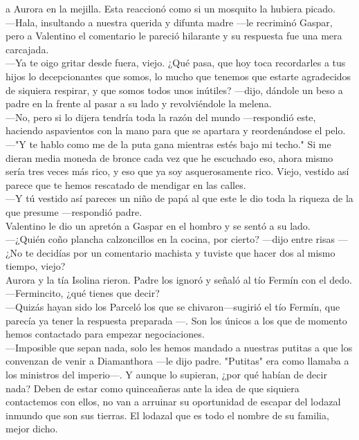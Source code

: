 \documentclass[
  letterpaper,
]{krantz}
\begin{document}
a Aurora en la mejilla. Esta reaccionó como si un mosquito la hubiera
picado.\\
---Hala, insultando a nuestra querida y difunta madre ---le recriminó
Gaspar, pero a Valentino el comentario le pareció hilarante y su
respuesta fue una mera carcajada.\\
---Ya te oigo gritar desde fuera, viejo. ¿Qué pasa, que hoy toca
recordarles a tus hijos lo decepcionantes que somos, lo mucho que
tenemos que estarte agradecidos de siquiera respirar, y que somos todos
unos inútiles? ---dijo, dándole un beso a padre en la frente al pasar a
su lado y revolviéndole la melena.\\
---No, pero si lo dijera tendría toda la razón del mundo ---respondió
este, haciendo aspavientos con la mano para que se apartara y
reordenándose el pelo. ~\\
---"Y te hablo como me de la puta gana mientras estés bajo mi techo." Si
me dieran media moneda de bronce cada vez que he escuchado eso, ahora
mismo sería tres veces más rico, y eso que ya soy asquerosamente rico.
Viejo, vestido así parece que te hemos rescatado de mendigar en las
calles.\\
---Y tú vestido así pareces un niño de papá al que este le dio toda la
riqueza de la que presume ---respondió padre.\\
Valentino le dio un apretón a Gaspar en el hombro y se sentó a su
lado.\\
---¿Quién coño plancha calzoncillos en la cocina, por cierto? ---dijo
entre risas --- ¿No te decidías por un comentario machista y tuviste que
hacer dos al mismo tiempo, viejo?\\
Aurora y la tía Isolina rieron. Padre los ignoró y señaló al tío Fermín
con el dedo.\\
---Fermincito, ¿qué tienes que decir?\\
---Quizás hayan sido los Parceló los que se chivaron---sugirió el tío
Fermín, que parecía ya tener la respuesta preparada ---. Son los únicos
a los que de momento hemos contactado para empezar negociaciones.\\
---Imposible que sepan nada, solo les hemos mandado a nuestras putitas a
que los convenzan de venir a Diamanthora ---le dijo padre. "Putitas" era
como llamaba a los ministros del imperio---. Y aunque lo supieran, ¿por
qué habían de decir nada? Deben de estar como quinceañeras ante la idea
de que siquiera contactemos con ellos, no van a arruinar su oportunidad
de escapar del lodazal inmundo que son sus tierras. El lodazal que es
todo el nombre de su familia, mejor dicho.\\
\end{document}
